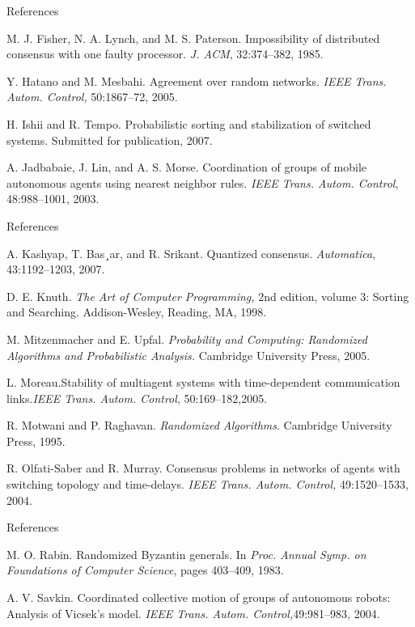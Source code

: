 \documentclass[xcolor={dvipsnames}]{beamer}
\begin{document}
\begin{thebibliography}{30}
\begin{frame}{References}
		
		 M. J. Fisher, N. A. Lynch, and M. S. Paterson. Impossibility of distributed consensus with one faulty processor. \textit{J. ACM}, 32:374–382, 1985.
		
		
		 Y. Hatano and M. Mesbahi. Agreement over random networks. \textit{IEEE Trans. Autom. Control,} 50:1867–72, 2005.
		
		
		 H. Ishii and R. Tempo. Probabilistic sorting and stabilization of switched systems. Submitted for publication, 2007.
	 
        
         A. Jadbabaie, J. Lin, and A. S. Morse. Coordination of groups of mobile autonomous agents using nearest neighbor rules. \textit{IEEE Trans. Autom. Control}, 48:988–1001, 2003.
		
	\end{frame}

	\begin{frame}{References}
		
		 A. Kashyap, T. Bas¸ar, and R. Srikant. Quantized consensus. \textit{Automatica}, 43:1192–1203, 2007.
		
		
		 D. E. Knuth. \textit{The Art of Computer Programming,} 2nd edition, volume 3: Sorting and Searching. Addison-Wesley, Reading, MA, 1998.
		
		
		 M. Mitzenmacher and E. Upfal. \textit{Probability and Computing: Randomized Algorithms and Probabilistic Analysis.} Cambridge University Press, 2005.
		
		
		 L. Moreau.Stability of multiagent systems with time-dependent communication links.\textit{IEEE Trans. Autom. Control}, 50:169–182,2005.
		
		
		 R. Motwani and P. Raghavan. \textit{Randomized Algorithms}. Cambridge University Press, 1995.
		
		
		 R. Olfati-Saber and R. Murray. Consensus problems in networks of agents with switching topology and time-delays. \textit{IEEE Trans. Autom. Control,} 49:1520–1533, 2004.
		
	\end{frame}

	\begin{frame}{References}
		
		 M. O. Rabin. Randomized Byzantin generals. In \textit{Proc. Annual Symp. on Foundations of Computer Science}, pages 403–409, 1983.
		
		
		 A. V. Savkin. Coordinated collective motion of groups of autonomous robots: Analysis of Vicsek’s model. \textit{IEEE Trans. Autom. Control,}49:981–983, 2004.
		

\end{frame}
\end{thebibliography}
\end{document}
